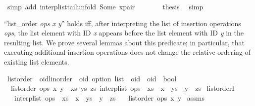 \begin{isabellebody}
\ {\isacharparenleft}simp\ add{\isacharcolon}\ interp{\isacharunderscore}list{\isacharunderscore}tail{\isacharunderscore}unfold\ Some\ x{\isacharunderscore}pair{\isacharparenright}\isanewline
\ \ \ \ \isamarkupfalse%
\ \isamarkupfalse%
\ {\isacharquery}thesis\ \isamarkupfalse%
\ simp\isanewline
\ \ \isamarkupfalse%
\isanewline
{}\isamarkupfalse%
%
\endisatagproof
{\isafoldproof}%
%
\isadelimproof
%
\endisadelimproof
%
\isamarkuptrue%
%
\begin{isamarkuptext}%
``list\_order \emph{ops x y}'' holds iff, after interpreting the list of
insertion operations \emph{ops}, the list element with ID \emph{x} appears
before the list element with ID \emph{y} in the resulting list. We prove several
lemmas about this predicate; in particular, that executing additional insertion
operations does not change the relative ordering of existing list elements.%
\end{isamarkuptext}\isamarkuptrue%
\isamarkupfalse%
\ list{\isacharunderscore}order\ {\isacharcolon}{\isacharcolon}\ {\isachardoublequoteopen}{\isacharparenleft}{\isacharprime}oid{\isacharcolon}{\isacharcolon}{\isacharbraceleft}linorder{\isacharbraceright}\ {\isasymtimes}\ {\isacharprime}oid\ option{\isacharparenright}\ list\ {\isasymRightarrow}\ {\isacharprime}oid\ {\isasymRightarrow}\ {\isacharprime}oid\ {\isasymRightarrow}\ bool{\isachardoublequoteclose}\ \isanewline
\ \ {\isachardoublequoteopen}list{\isacharunderscore}order\ ops\ x\ y\ {\isasymequiv}\ {\isasymexists}xs\ ys\ zs{\isachardot}\ interp{\isacharunderscore}list\ ops\ {\isacharequal}\ xs\ {\isacharat}\ {\isacharbrackleft}x{\isacharbrackright}\ {\isacharat}\ ys\ {\isacharat}\ {\isacharbrackleft}y{\isacharbrackright}\ {\isacharat}\ zs{\isachardoublequoteclose}\isanewline
\isanewline
{}\isamarkupfalse%
\ list{\isacharunderscore}orderI{\isacharcolon}\isanewline
\ \ \ {\isachardoublequoteopen}interp{\isacharunderscore}list\ ops\ {\isacharequal}\ xs\ {\isacharat}\ {\isacharbrackleft}x{\isacharbrackright}\ {\isacharat}\ ys\ {\isacharat}\ {\isacharbrackleft}y{\isacharbrackright}\ {\isacharat}\ zs{\isachardoublequoteclose}\isanewline
\ \ \ {\isachardoublequoteopen}list{\isacharunderscore}order\ ops\ x\ y{\isachardoublequoteclose}\isanewline
%
\isadelimproof
%
\endisadelimproof
%
\isatagproof
{}\isamarkupfalse%
\ assms\ \isamarkupfalse%

\end{isabellebody}

